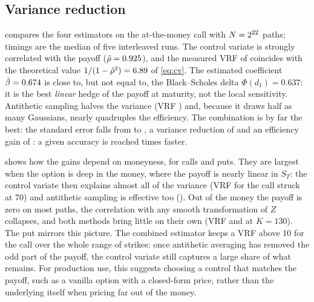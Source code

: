 \documentclass[11pt,a4paper]{article}
\newcommand{\1}{\mathbf{1}}
\theoremstyle{plain}
\theoremstyle{remark}
\begin{document}
\subsection{Variance reduction}\label{sec:res-vr}

 compares the four estimators on the at-the-money call with $N = \TablePaths$ paths; timings are
the median of five interleaved runs. The control variate is strongly correlated with the payoff
($\hat\rho = 0.925$), and the measured VRF of \VRFCV{} coincides with the theoretical value
$1/(1-\hat\rho^2) = 6.89$ of \eqref{eq:cv}. The estimated coefficient $\hat\beta = 0.674$ is close to,
but not equal to, the Black--Scholes delta $\Phi(d_1) = 0.637$: it is the best \emph{linear} hedge of the payoff
at maturity, not the local sensitivity. Antithetic sampling halves the variance (VRF \VRFAnti) and, because it
draws half as many Gaussians, nearly quadruples the efficiency. The combination is by far the best: the
standard error falls from \CrudeSE{} to \BothSE{}, a variance reduction of \VRFBoth{} and an efficiency gain of
\EffBoth: a given accuracy is reached \EffBoth{} times faster.

\begin{table}[ht]
\centering
\caption{At-the-money call ($C = \BSPrice$), $N = \TablePaths$ payoff evaluations per method. $z$ is the error
in standard errors, $\hat\rho$ the correlation between payoff and control, VRF the variance reduction factor and
the efficiency gain is defined in \eqref{eq:efficiency}.}
\label{tab:vr}
\small

\end{table}

 shows how the gains depend on moneyness, for calls and puts. They are largest when the option is
deep in the money, where the payoff is nearly linear in $S_T$: the control variate then explains almost all of
the variance (VRF \VRFCVCallLow{} for the call struck at 70) and antithetic sampling is effective too
(\VRFAntiCallLow). Out of the money the payoff is zero on most paths, the correlation with any smooth
transformation of $Z$ collapses, and both methods bring little on their own (VRF \VRFAntiCallHigh{} and
\VRFCVCallHigh{} at $K = 130$). The put mirrors this picture. The combined estimator keeps a VRF above 10 for the
call over the whole range of strikes: once antithetic averaging has removed the odd part of the payoff, the
control variate still captures a large share of what remains. For production use, this suggests choosing a
control that matches the payoff, such as a vanilla option with a closed-form price, rather than the underlying
itself when pricing far out of the money.
\end{document}
